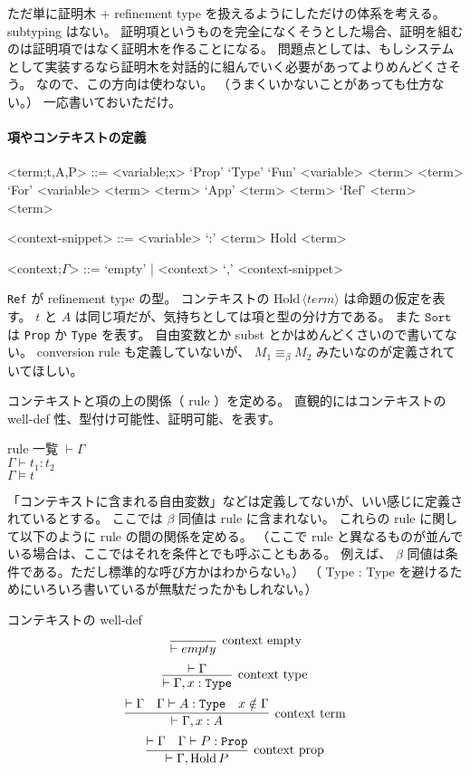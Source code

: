 ただ単に証明木 + refinement type を扱えるようにしただけの体系を考える。
subtyping はない。
証明項というものを完全になくそうとした場合、証明を組むのは証明項ではなく証明木を作ることになる。
問題点としては、もしシステムとして実装するなら証明木を対話的に組んでいく必要があってよりめんどくさそう。
なので、この方向は使わない。
（うまくいかないことがあっても仕方ない。）
一応書いておいただけ。

\paragraph*{項やコンテキストの定義}
\begin{grammar}
<term;t,A,P> ::= <variable;x> 
\alt `Prop'
\alt `Type'
\alt `Fun' <variable> <term> <term>
\alt `For' <variable> <term> <term>
\alt `App' <term> <term>
\alt `Ref' <term> <term>

<context-snippet> ::= <variable> `:' <term>
\alt Hold <term>

<context;\(\Gamma\)> ::= `empty' | <context> `,' <context-snippet>
\end{grammar}

\texttt{Ref} が refinement type の型。
コンテキストの \(\text{Hold} \, \langle term \rangle\) は命題の仮定を表す。
\(t\) と \(A\) は同じ項だが、気持ちとしては項と型の分け方である。
また \(\texttt{Sort}\) は \texttt{Prop} か \texttt{Type} を表す。
自由変数とか subst とかはめんどくさいので書いてない。 conversion rule も定義していないが、 \(M_1 \equiv_{\beta} M_2\) みたいなのが定義されていてほしい。

コンテキストと項の上の関係（ rule ）を定める。
直観的にはコンテキストの well-def 性、型付け可能性、証明可能、を表す。

\begin{itembox}[l]{rule 一覧}
  \(\vdash \Gamma \) \\
  \(\Gamma \vdash t_1 : t_2\) \\
  \(\Gamma \vDash t \)
\end{itembox}

「コンテキストに含まれる自由変数」などは定義してないが、いい感じに定義されているとする。
ここでは \(\beta\) 同値は rule に含まれない。
これらの rule に関して以下のように rule の間の関係を定める。
（ここで rule と異なるものが並んでいる場合は、ここではそれを条件とでも呼ぶこともある。
例えば、 \(\beta\) 同値は条件である。ただし標準的な呼び方かはわからない。）
（ Type : Type を避けるためにいろいろ書いているが無駄だったかもしれない。）

\begin{itembox}[l]{コンテキストの well-def}
  \[\infer[\text{context empty}]{\vdash empty}{} \]
  \[\infer[\text{context type}]{\vdash \Gamma , x : \texttt{Type}}{\vdash \Gamma}\]
  \[\infer[\text{context term}]{\vdash \Gamma , x : A}{\vdash \Gamma & \Gamma \vdash A : \texttt{Type} & x \notin \Gamma} \]
  \[\infer[\text{context prop}]{\vdash \Gamma , \text{Hold} \, P}{\vdash \Gamma & \Gamma \vdash P : \texttt{Prop}} \]
\end{itembox}

